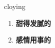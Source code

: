 
\begin{frame}
{\huge cloying}
\begin{center}
\begin{enumerate}\Large
  \item \textbf{甜得发腻的}
  \item \textbf{感情用事的}
\end{enumerate}
\end{center}
\end{frame}

